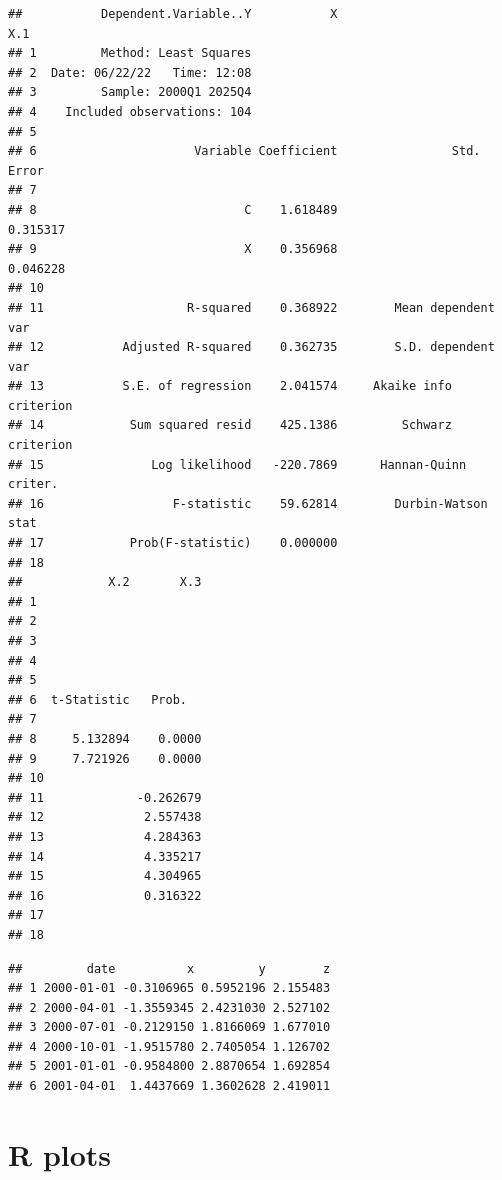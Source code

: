 \documentclass[
]{article}
\begin{document}
\begin{verbatim}
##           Dependent.Variable..Y           X                       X.1
## 1         Method: Least Squares                                      
## 2  Date: 06/22/22   Time: 12:08                                      
## 3         Sample: 2000Q1 2025Q4                                      
## 4    Included observations: 104                                      
## 5                                                                    
## 6                      Variable Coefficient                Std. Error
## 7                                                                    
## 8                             C    1.618489                  0.315317
## 9                             X    0.356968                  0.046228
## 10                                                                   
## 11                    R-squared    0.368922        Mean dependent var
## 12           Adjusted R-squared    0.362735        S.D. dependent var
## 13           S.E. of regression    2.041574     Akaike info criterion
## 14            Sum squared resid    425.1386         Schwarz criterion
## 15               Log likelihood   -220.7869      Hannan-Quinn criter.
## 16                  F-statistic    59.62814        Durbin-Watson stat
## 17            Prob(F-statistic)    0.000000                          
## 18                                                                   
##            X.2       X.3
## 1                       
## 2                       
## 3                       
## 4                       
## 5                       
## 6  t-Statistic   Prob.  
## 7                       
## 8     5.132894    0.0000
## 9     7.721926    0.0000
## 10                      
## 11             -0.262679
## 12              2.557438
## 13              4.284363
## 14              4.335217
## 15              4.304965
## 16              0.316322
## 17                      
## 18
\end{verbatim}

\begin{verbatim}
##         date          x         y        z
## 1 2000-01-01 -0.3106965 0.5952196 2.155483
## 2 2000-04-01 -1.3559345 2.4231030 2.527102
## 3 2000-07-01 -0.2129150 1.8166069 1.677010
## 4 2000-10-01 -1.9515780 2.7405054 1.126702
## 5 2001-01-01 -0.9584800 2.8870654 1.692854
## 6 2001-04-01  1.4437669 1.3602628 2.419011
\end{verbatim}

\hypertarget{r-plots}{%
\section{R plots}\label{r-plots}}
\end{document}
